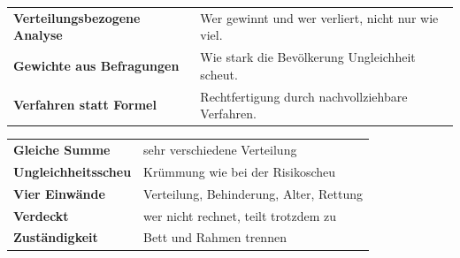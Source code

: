 \begin{forschung}
\begin{center}
{\small
\renewcommand{\arraystretch}{1.45}
\begin{tabular}{@{}P{3.4cm}P{4.8cm}@{}}
\toprule
\textbf{Verteilungsbezogene Analyse} & Wer gewinnt und wer verliert, nicht nur wie viel.\\
\textbf{Gewichte aus Befragungen} & Wie stark die Bevölkerung Ungleichheit scheut.\\
\textbf{Verfahren statt Formel} & Rechtfertigung durch nachvollziehbare Verfahren.\\
\bottomrule
\end{tabular}}
\end{center}

\begin{center}
\begin{minipage}{0.88\textwidth}
\end{minipage}
\end{center}
\end{forschung}

\begin{merksatz}
\begin{center}
\renewcommand{\arraystretch}{1.5}
\begin{tabular}{@{}P{3.0cm}P{5.6cm}@{}}
\toprule
\textbf{Gleiche Summe} & sehr verschiedene Verteilung\\
\textbf{Ungleichheits\-scheu} & Krümmung wie bei der Risikoscheu\\
\textbf{Vier Einwände} & Verteilung, Behinderung, Alter, Rettung\\
\textbf{Verdeckt} & wer nicht rechnet, teilt trotzdem zu\\
\textbf{Zuständigkeit} & Bett und Rahmen trennen\\
\bottomrule
\end{tabular}
\end{center}

\begin{center}
\begin{minipage}{0.88\textwidth}
\end{minipage}
\end{center}
\end{merksatz}

